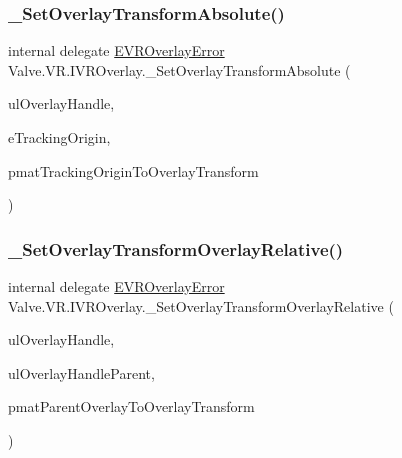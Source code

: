 \subsubsection{\texorpdfstring{\_SetOverlayTransformAbsolute()}{\_SetOverlayTransformAbsolute()}}
{\footnotesize\ttfamily internal delegate \mbox{\hyperlink{namespace_valve_1_1_v_r_aaee5c5144f42b7969d45b854f51b0c18}{E\+V\+R\+Overlay\+Error}} Valve.\+V\+R.\+I\+V\+R\+Overlay.\+\_\+\+Set\+Overlay\+Transform\+Absolute (\begin{DoxyParamCaption}\item[{ulong}]{ul\+Overlay\+Handle,  }\item[{\mbox{\hyperlink{namespace_valve_1_1_v_r_a29be99a3c2f780157bd490db06a7f12f}{E\+Tracking\+Universe\+Origin}}}]{e\+Tracking\+Origin,  }\item[{ref \mbox{\hyperlink{struct_valve_1_1_v_r_1_1_hmd_matrix34__t}{Hmd\+Matrix34\+\_\+t}}}]{pmat\+Tracking\+Origin\+To\+Overlay\+Transform }\end{DoxyParamCaption})}

\mbox{\label{struct_valve_1_1_v_r_1_1_i_v_r_overlay_a316bb946cf3419e40e836a5876bc7522}} 
\subsubsection{\texorpdfstring{\_SetOverlayTransformOverlayRelative()}{\_SetOverlayTransformOverlayRelative()}}
{\footnotesize\ttfamily internal delegate \mbox{\hyperlink{namespace_valve_1_1_v_r_aaee5c5144f42b7969d45b854f51b0c18}{E\+V\+R\+Overlay\+Error}} Valve.\+V\+R.\+I\+V\+R\+Overlay.\+\_\+\+Set\+Overlay\+Transform\+Overlay\+Relative (\begin{DoxyParamCaption}\item[{ulong}]{ul\+Overlay\+Handle,  }\item[{ulong}]{ul\+Overlay\+Handle\+Parent,  }\item[{ref \mbox{\hyperlink{struct_valve_1_1_v_r_1_1_hmd_matrix34__t}{Hmd\+Matrix34\+\_\+t}}}]{pmat\+Parent\+Overlay\+To\+Overlay\+Transform }\end{DoxyParamCaption})}

\mbox{\label{struct_valve_1_1_v_r_1_1_i_v_r_overlay_a3d145314a3a3a2bd5bf35892b56db863}} 
